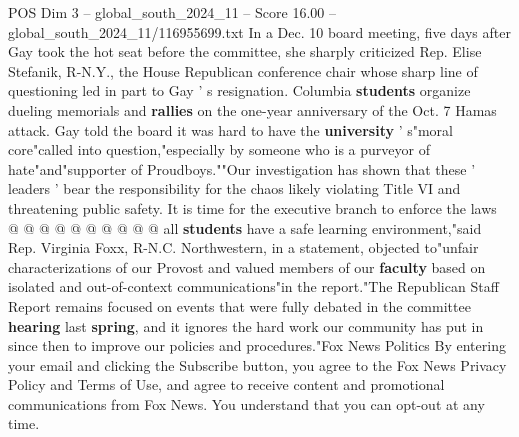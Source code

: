 \begin{textsample}{POS Dim 3 – global\_south\_2024\_11 – Score 16.00 – global\_south\_2024\_11/116955699.txt}
In a Dec. 10 board meeting, five days after Gay took the hot seat before the committee, she sharply criticized Rep.
Elise Stefanik, R-N.Y., the House Republican conference chair whose sharp line of questioning led in part to Gay ' s resignation.
Columbia \textbf{students} organize dueling memorials and \textbf{rallies} on the one-year anniversary of the Oct. 7 Hamas attack.
Gay told the board it was hard to have the \textbf{university} ' s"moral core"called into question,"especially by someone who is a purveyor of hate"and"supporter of Proudboys.""Our investigation has shown that these ' leaders ' bear the responsibility for the chaos likely violating Title VI and threatening public safety.
It is time for the executive branch to enforce the laws @ @ @ @ @ @ @ @ @ @ all \textbf{students} have a safe learning environment,"said Rep.
Virginia Foxx, R-N.C.
Northwestern, in a statement, objected to"unfair characterizations of our Provost and valued members of our \textbf{faculty} based on isolated and out-of-context communications"in the report."The Republican Staff Report remains focused on events that were fully debated in the committee \textbf{hearing} last \textbf{spring}, and it ignores the hard work our community has put in since then to improve our policies and procedures."Fox News Politics By entering your email and clicking the Subscribe button, you agree to the Fox News Privacy Policy and Terms of Use, and agree to receive content and promotional communications from Fox News.
You understand that you can opt-out at any time.

\end{textsample}
